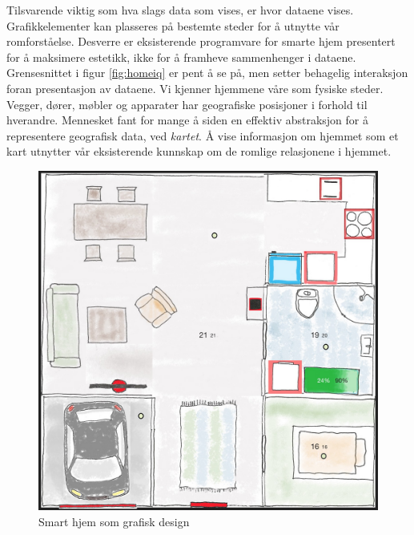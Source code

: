 Tilsvarende viktig som hva slags data som vises, er hvor dataene vises. Grafikkelementer kan plasseres på bestemte steder for å utnytte vår romforståelse. Desverre er eksisterende programvare for smarte hjem presentert for å maksimere estetikk, ikke for å framheve sammenhenger i dataene. Grensesnittet i figur \ref{fig:homeiq} er pent å se på, men setter behagelig interaksjon foran presentasjon av dataene. Vi kjenner hjemmene våre som fysiske steder. Vegger, dører, møbler og apparater har geografiske posisjoner i forhold til hverandre. Mennesket fant for mange å siden en effektiv abstraksjon for å representere geografisk data, ved \emph{kartet}. Å vise informasjon om hjemmet som et kart utnytter vår eksisterende kunnskap om de romlige relasjonene i hjemmet.
\begin{figure}
\centering
\includegraphics[scale=0.28]{fig/smarthome}
\caption{Smart hjem som grafisk design}
\label{fig:smarthjemgrafisk}
\end{figure}
